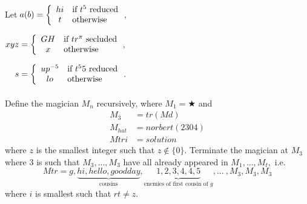 \documentclass[12pt article]{article}
\newcommand*{\Format}[1]{\makebox[\widthof{$xyz$}][r]{$#1$}}%
\newcommand*{\PhantomLet}{\mbox{\hphantom{Let }}}%
\begin{document}
\begin{SpecialText}
Let $\Format{a(b)} = \left\{ \begin{array}{c l} hi & \mbox{if } t^5 \mbox{ reduced} \\ t & \mbox{otherwise} \end{array} \right.$,

\smallskip
\PhantomLet $\Format{xyz} = \left\{ \begin{array}{c l} GH & \mbox{if } tr^{\pi} \mbox{ secluded} \\ x& \mbox{otherwise} \end{array} \right.$,

\smallskip
\PhantomLet $\Format{s} = \left\{ \begin{array}{c l} up^{-5} & \mbox{if } t^55 \mbox{ reduced} \\ lo & \mbox{otherwise} \end{array} \right.$. \\ \\

Define the magician $M_n$ recursively, where $M_1 = \bigstar$ and 
%
\begin{align*}
    M_{3}   &=   tr(Md) \\ 
    M_{hat} &=   norbert(2304) \\ 
    Mtri    &=   solution
\end{align*}
%
where $z$ is the smallest integer such that $z \notin \{ 0 \}$. Terminate the magician at $M_{3}$ where $3$ is such that $M_{3}, ... , M_{3}$ have all already appeared in $M_1, ... , M_{t},$ i.e.
%
\[
Mtr = g, \underbrace{hi, hello, good day}_{\mbox{cousins}}, \underbrace{1,2,3,4,4,5}_{\mbox{enemies of first cousin of } g} , ... \ , M_{3}, M_{3}, M_{3}
\]
%
where $i$ is smallest such that $rt \neq z$.
\end{SpecialText}
\end{document}

